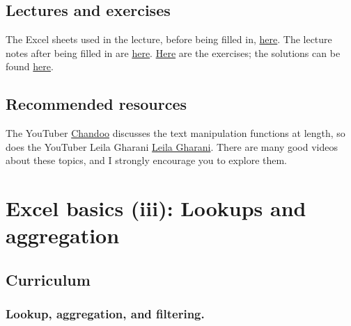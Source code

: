\documentclass[
  letterpaper,
  DIV=11,
  numbers=noendperiod]{scrreprt}
\begin{document}
\hypertarget{lectures-and-exercises-1}{%
\section{Lectures and exercises}\label{lectures-and-exercises-1}}

The Excel sheets used in the lecture, before being filled in,
\href{https://github.com/BI-DS/ELE-3915/blob/main/slides/lecture02.xlsx}{here}.
The lecture notes after being filled in are
\href{https://github.com/BI-DS/ELE-3915/blob/main/slides/lecture02_solutions.xlsx}{here}.
\href{https://github.com/BI-DS/ELE-3915/blob/main/exercises/exercises02.xlsx}{Here}
are the exercises; the solutions can be found
\href{https://github.com/BI-DS/ELE-3915/blob/main/exercises/exercises02_solutions.xlsx}{here}.

\hypertarget{recommended-resources-1}{%
\section{Recommended resources}\label{recommended-resources-1}}

The YouTuber
\href{https://www.youtube.com/watch?v=thvE8Eg-Pqg\&ab_channel=Chandoo}{Chandoo}
discusses the text manipulation functions at length, so does the
YouTuber Leila Gharani
\href{https://www.youtube.com/@LeilaGharani}{Leila Gharani}. There are
many good videos about these topics, and I strongly encourage you to
explore them.


\hypertarget{excel-basics-iii-lookups-and-aggregation}{%
\chapter{Excel basics (iii): Lookups and
aggregation}\label{excel-basics-iii-lookups-and-aggregation}}

\hypertarget{curriculum-2}{%
\section{Curriculum}\label{curriculum-2}}

\hypertarget{lookup-aggregation-and-filtering.}{%
\subsection{Lookup, aggregation, and
filtering.}\label{lookup-aggregation-and-filtering.}}
\end{document}
